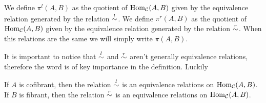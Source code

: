 \begin{definition}
	We define $\pi^l(A,B)$ as the quotient of $\mathrm{Hom}_{\mathcal{C}}(A,B)$ given by the equivalence relation generated by the relation $\mathrel{\overset{l}{\sim}}$. We define $\pi^r(A,B)$ as the quotient of $\mathrm{Hom}_{\mathcal{C}}(A,B)$ given by the equivalence relation generated by the relation $\mathrel{\overset{r}{\sim}}$. When this relations are the same we will simply write $\pi(A,B)$.
\end{definition}

It is important to notice that $\mathrel{\overset{l}{\sim}}$ and $\mathrel{\overset{r}{\sim}}$ aren't generally equivalence relations, therefore the word  is of key importance in the definition. Luckily 

\begin{lemma}
	If $A$ is cofibrant, then the relation $\mathrel{\overset{l}{\sim}}$  is an equivalence relations on $\mathrm{Hom}_{\mathcal{C}}(A,B)$.
	If $B$ is fibrant, then the relation $\mathrel{\overset{r}{\sim}}$ is an equivalence relations on $\mathrm{Hom}_{\mathcal{C}}(A,B)$. 
\end{lemma}

